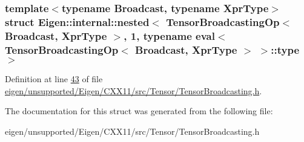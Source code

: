 \subsubsection*{template$<$typename Broadcast, typename Xpr\+Type$>$\newline
struct Eigen\+::internal\+::nested$<$ Tensor\+Broadcasting\+Op$<$ Broadcast, Xpr\+Type $>$, 1, typename eval$<$ Tensor\+Broadcasting\+Op$<$ Broadcast, Xpr\+Type $>$ $>$\+::type $>$}



Definition at line \hyperlink{eigen_2unsupported_2_eigen_2_c_x_x11_2src_2_tensor_2_tensor_broadcasting_8h_source_l00043}{43} of file \hyperlink{eigen_2unsupported_2_eigen_2_c_x_x11_2src_2_tensor_2_tensor_broadcasting_8h_source}{eigen/unsupported/\+Eigen/\+C\+X\+X11/src/\+Tensor/\+Tensor\+Broadcasting.\+h}.



The documentation for this struct was generated from the following file\+:\begin{DoxyCompactItemize}
\item 
eigen/unsupported/\+Eigen/\+C\+X\+X11/src/\+Tensor/\+Tensor\+Broadcasting.\+h\end{DoxyCompactItemize}
